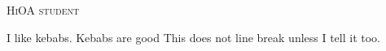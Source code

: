 \documentclass{article}
\begin{document}
\begin{titlepage}
	\centering
	\scshape\LARGE HiOA student \par
\end{titlepage}
I like kebabs. 
Kebabs are good 
This does not line break unless I tell it too.
\end{document}
